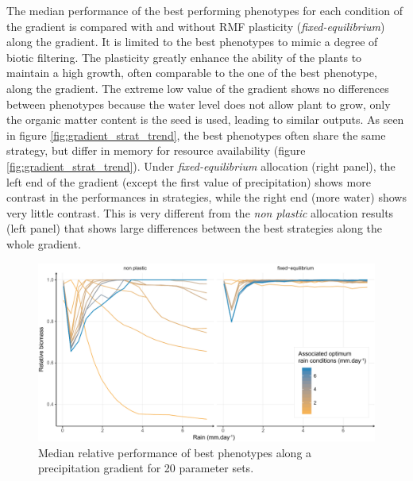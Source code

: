 The median performance of the best performing phenotypes for each condition of the gradient is compared with and without RMF plasticity (\textit{fixed-equilibrium}) along the gradient. It is limited to the best phenotypes to mimic a degree of biotic filtering. The plasticity greatly enhance the ability of the plants to maintain a high growth, often comparable to the one of the best phenotype, along the gradient. The extreme low value of the gradient shows no differences between phenotypes because the water level does not allow plant to grow, only the organic matter content is the seed is used, leading to similar outputs. As seen in figure \ref{fig:gradient_strat_trend}, the best phenotypes often share the same strategy, but differ in memory for resource availability (figure \ref{fig:gradient_strat_trend}). Under \textit{fixed-equilibrium} allocation (right panel), the left end of the gradient (except the first value of precipitation) shows more contrast in the performances in strategies, while the right end (more water) shows very little contrast. This is very different from the \textit{non plastic} allocation results (left panel) that shows large differences between the best strategies along the whole gradient.  

\begin{figure}
\includegraphics[width = \textwidth]{./2_PP/Figures/Rain/optimum_shifting_median.pdf}
\caption{Median relative performance of best phenotypes along a precipitation gradient for 20 parameter sets.}\label{fig:gradient_ranking}
\end{figure}

%
%





